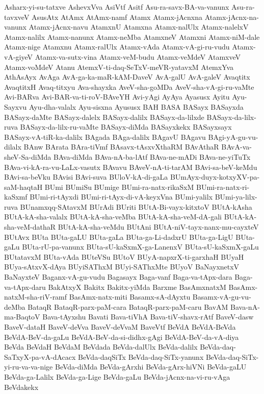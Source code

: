 {Asharx-yi-su-tatxve
AshevxVva
AsiVtf
Asitf
Asu-ra-savx-BA-va-vanunx
Asu-ra-tavxveV
AsusAtx
AtAmx
AtAmx-namf
Atamx
Atamx-jAcnxna
Atamx-jAcnx-na-vanunx
Atamx-jAcnx-navu
AtamxnU
Atamxna
Atamx-nalUlx
Atamx-nalelxV
Atamx-nalilx
Atamx-nanunx
Atamx-neMba
AtamxneV
Atamxni
Atamx-niM-dale
Atamx-nige
Atamxnu
Atamx-ralUlx
Atamx-vAda
Atamx-vA-gi-ru-vudu
Atamx-vA-giyeV
Atamx-va-sutx-vina
Atamx-veM-budu
Atamx-veMdeV
AtamxveV
Atamx-voMdeV
Atanu
AtemxV-ti-daq-SeTxV-meVR-yatavxM
AtemxYva
AthAsAyx
AvAga
AvA-ga-ka-maR-kAM-DaveV
AvA-galU
AvA-galeV
Avaqtitx
AvaqtitxH
Avaq-titxyu
Ava-shayxka
AveV-sha-goMDa
AveV-sha-vA-gi-ru-vaMte
Avi-BARva
Avi-BAR-va-ti-roV-BAveYH
Avi-yAgi
AyAya
Ayasusx
Ayitu
Ayu-Sayxvu
Ayu-dha-valalx
Ayu-sisxna
Ayususx
BAH
BASA
BASayx
BASayxda
BASayx-daMte
BASayx-dalelx
BASayx-dalilx
BASayx-da-lilxde
BASayx-da-lilx-ruva
BASayx-da-lilx-ru-vaMte
BASayx-diMda
BASayxkekx
BASayxsayx
BASayx-vA-tiR-ka-dalilx
BAgada
BAga-dalilx
BAgavU
BAgavu
BAgi-yA-gu-vu-dilalx
BAnw
BArata
BAra-tiVmf
BAsavx-tAsxvXthaRM
BAvAthaR
BAvA-va-sheV-Sa-diMda
BAva-diMda
BAva-nA-ba-lAtf
BAva-ne-mADi
BAva-ne-yiTuTx
BAva-vi-kA-ra-vu-LaLx-vasutx
BAvavu
BAveV-nA-ti-tarAM
BAvi-sa-beV-keMdu
BAvi-sa-beVku
BAvisi
BAvi-suva
BUloV-kA-di-gaLa
BUmAyx-duyx-kotxyXV-pa-saM-haqtaH
BUmi
BUmiSu
BUmige
BUmi-ra-natx-rikaSxM
BUmi-ra-natx-ri-kaSxmf
BUmi-ri-tAyxdi
BUmi-ri-tAyx-di-vA-keyxVna
BUmi-yalilx
BUmi-ya-lilx-ruva
BUnamxqq-SAtavxM
BUrAdi
BUriti
BUtA-Bi-vayx-kitxtoV
BUtA-kAsha
BUtA-kA-sha-valalx
BUtA-kA-sha-veMba
BUtA-kA-sha-veM-dA-gali
BUtA-kA-sha-veM-dathaR
BUtA-kA-sha-veMdu
BUtAni
BUtA-niV-tayx-nanx-mu-cayxteV
BUtAvx
BUta
BUta-gaLU
BUta-gaLa
BUta-ga-Li-dadxrU
BUta-ga-LigU
BUta-gaLu
BUta-rU-pa-vanunx
BUta-sU-kaSxmX-ga-LanenxV
BUta-sU-kaSxmX-gaLu
BUtatavxM
BUta-vAda
BUteVSu
BUtoV
BUyA-napxrX-ti-garxhaH
BUyaH
BUya-sAtxvX-dAya
BUyiSAThxM
BUyi-SAThxMte
BUyoV
BaNayxnetxV
BaNayxteV
Baganx-vA-gu-vudu
Bagasayx
Baga-vanf
Baga-va-tApx-dara
Baga-va-tApx-daru
BakAtxyX
Bakitx
Bakitx-yiMda
Barxme
BasAmxnatxM
BasAmx-natxM-sha-riV-ramf
BasAmx-natx-miti
Basamx-sA-dAyxtu
Basamx-vA-gu-vu-deMba
BataqR
BataqR-parx-paM-cara
BataqR-parx-paM-caru
BavAM
Bava-nA-ma-BaqtoV
Bava-tAyxshu
Bavati
Bava-tiVhA
Bava-tiV-shavx-rAtf
BaveV-dasw
BaveV-dataH
BaveV-deVva
BaveV-deVvaM
BaveVtf
BeVdA
BeVdA-BeVda
BeVdA-BeV-da-gaLu
BeVdA-BeV-da-si-didhx-gAgi
BeVdA-BeV-da-vA-diya
BeVda
BeVdaH
BeVdaM
BeVdada
BeVda-dalUlx
BeVda-dalilx
BeVda-daq-SaTxyX-pa-vA-dAcacx
BeVda-daqSiTx
BeVda-daq-SiTx-yanunx
BeVda-daq-SiTx-yi-ru-va-va-nige
BeVda-diMda
BeVda-gArxhi
BeVda-gArx-hiVNi
BeVda-gaLU
BeVda-ga-Lalilx
BeVda-ga-Lige
BeVda-gaLu
BeVda-jAcnx-na-vi-ru-vAga
BeVdakekx
}
